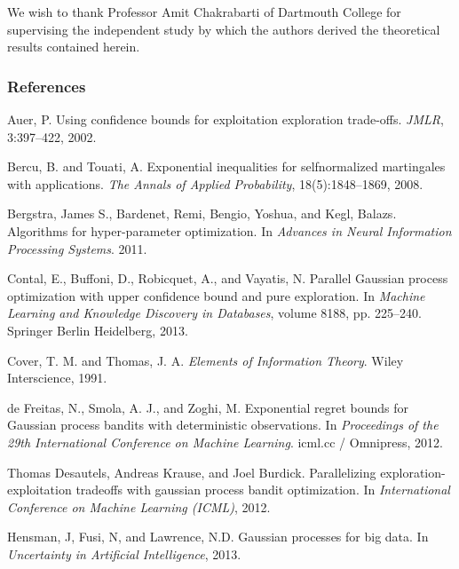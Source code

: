 \documentclass[]{article}
\newcommand{\1}{\mathbf{1}}
\newcommand{\0}{\mathbf{0}}
\begin{document}
We wish to thank Professor Amit Chakrabarti of Dartmouth College for supervising the independent study by which the authors derived the theoretical results contained herein.


\subsubsection*{References}

\begingroup
\renewcommand{\section}[2]{}
\begin{thebibliography}{}

Auer, P. Using confidence bounds for exploitation exploration trade-offs. \textit{JMLR}, 3:397–422, 2002.

Bercu, B. and Touati, A. Exponential inequalities for selfnormalized martingales with applications. \textit{The Annals of Applied Probability}, 18(5):1848–1869, 2008.

Bergstra, James S., Bardenet, Remi, Bengio, Yoshua, and Kegl, Balazs. Algorithms for hyper-parameter optimization. In \textit{Advances in Neural Information Processing Systems}. 2011.

Contal, E., Buffoni, D., Robicquet, A., and Vayatis, N. Parallel Gaussian process optimization with upper confidence bound and pure exploration. In \textit{Machine Learning and Knowledge Discovery in Databases}, volume 8188, pp. 225–240. Springer Berlin Heidelberg, 2013.

Cover, T. M. and Thomas, J. A. \textit{Elements of Information Theory}. Wiley Interscience, 1991.

de Freitas, N., Smola, A. J., and Zoghi, M. Exponential regret bounds for Gaussian process bandits with deterministic observations. In \textit{Proceedings of the 29th International Conference on Machine Learning}. icml.cc / Omnipress, 2012.

Thomas Desautels, Andreas Krause, and Joel Burdick. Parallelizing exploration-exploitation tradeoffs with gaussian process bandit optimization. In \textit{International Conference on Machine Learning (ICML)}, 2012.

Hensman, J, Fusi, N, and Lawrence, N.D. Gaussian processes for big data. In \textit{Uncertainty in Artificial Intelligence}, 2013.


\end{thebibliography}
\end{document}
